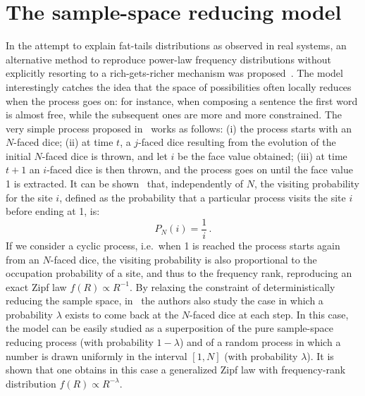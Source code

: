 \documentclass[graybox]{svmult}
\begin{document}
\section{The sample-space reducing model}
\label{sec:fra_dice}
In the attempt to explain fat-tails distributions as observed in real
systems, an alternative method to reproduce power-law frequency
distributions without explicitly resorting to a rich-gets-richer mechanism
was proposed~\cite{Thurner_2015}.  
The model interestingly catches the idea that the space of possibilities
often locally reduces when the process goes on: for instance, when
composing a sentence the first word is almost free, while the
subsequent ones are more and more constrained.
The very simple process proposed in~\cite{Thurner_2015} works as
follows: 
(i) the process starts with an $N$-faced dice; 
(ii) at time $t$,  a $j$-faced dice resulting from the evolution of the initial $N$-faced dice is thrown, 
and let $i$ be the face value obtained; 
(iii) at time $t+1$ an $i$-faced dice is then thrown, and the process goes on until the face value 1 is extracted. 
It can be shown~\cite{Thurner_2015}
that, independently of $N$, the visiting probability for the site $i$,
defined as the probability that a particular process visits the site
$i$ before ending at 1, is:
\begin{equation}
 P_N(i)= \frac{1}{i}  \,.
\end{equation}
%
If we consider a  cyclic process, i.e.\ when 1 is reached the process
starts again from an $N$-faced dice, 
the visiting probability is also proportional to the occupation
probability of a site, 
and thus to the frequency rank, reproducing  an exact Zipf law $f(R)\propto
R^{-1}$. 
By relaxing the constraint of deterministically reducing the
sample space,  in~\cite{Thurner_2015}
the authors also study the case in which a probability
 $\lambda$ exists to come
 back at the $N$-faced dice at each step. In this case, the model can
 be easily studied as a superposition of the pure sample-space reducing
 process (with probability $1-\lambda$) and of a random process in which a number is drawn uniformly
 in the interval $[1, N]$ (with probability $\lambda$).  It is shown
 that one obtains in this case a generalized Zipf law with frequency-rank distribution
 $f(R)\propto R^{-\lambda}$.
\end{document}
